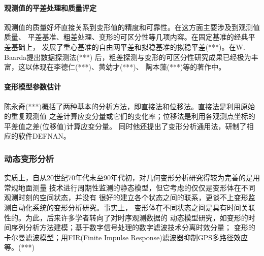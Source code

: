 \paragraph*{观测值的平差处理和质量评定}
观测值的质量好坏直接关系到变形值的精度和可靠性。在这方面主要涉及到观测值质量、
平差基准、粗差处理、变形的可区分性等几项内容。在固定基准的经典平差基础上，
发展了重心基准的自由网平差和拟稳基准的拟稳平差(***)。在W. Baarda提出数据探测法(***)
后，粗差探测与变形的可区分性研究成果已经极为丰富，这以体现在李德仁(***)、黄幼才(***)、
陶本藻(***)等的著作中。
\paragraph*{变形模型参数估计}
陈永奇(***)概括了两种基本的分析方法，即直接法和位移法。直接法是利用原始的重复观测值
之差计算应变分量或它们的变化率；位移法是利用各观测点坐标的平差值之差(位移值)计算应变分量。
同时他还提出了变形分析通用法，研制了相应的软件DEFNAN。

\subsubsection{动态变形分析}
实质上，自从20世纪70年代末至90年代初，对几何变形分析研究得较为完善的是用常规地面测量
技术进行周期性监测的静态模型，但它考虑的仅仅是变形体在不同观测时刻的空间状态，并没有
很好的建立各个状态之间的联系，更谈不上变形监测自动化系统的变形分析研究。事实上，
变形体在不同状态之间是具有时间关联性的。为此，后来许多学者转向了对时序观测数据的
动态模型研究，如变形的时间序列分析方法建模；基于数字信号处理的数字滤波技术分离时效分量；
变形的卡尔曼滤波模型；用FIR(Finite Impulse Response)滤波器抑制GPS多路径效应等。(***)

